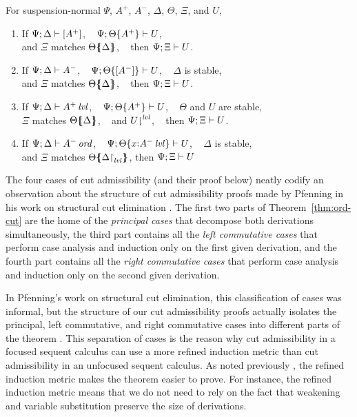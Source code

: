 \bigskip
\begin{theorem}\label{thm:ord-cut}
For suspension-normal $\Psi$, $A^+$, $A^-$, $\Delta$, $\Theta$, $\Xi$, and $U$,
\begin{enumerate}
\item If ${\Psi};{\Delta} \vdash {[ A^+ ]}$, ~
         ${\Psi};{{\Theta}\{{A^+}\}} \vdash {U}$,\\
      and $\Xi$ matches ${\Theta}\mbox{$\{\hspace{-4pt}\{$}{{\Delta}}\mbox{$\}\hspace{-4pt}\}$}$, ~
      then ${\Psi};{\Xi} \vdash {U}$.
\item If ${\Psi};{\Delta} \vdash {A^-}$, ~
         ${\Psi};{{\Theta}\{{[A^-]}\}} \vdash {U}$, ~
         $\Delta$ is stable, \\
      and $\Xi$ matches ${\Theta}\mbox{$\{\hspace{-4pt}\{$}{\Delta}\mbox{$\}\hspace{-4pt}\}$}$, ~
      then ${\Psi};{\Xi} \vdash {U}$.
\item If ${\Psi};{\Delta} \vdash {{A^+}\,{{\it lvl}}}$, ~
         ${\Psi};{{\Theta}\{{A^+}\}} \vdash {U}$, ~
         $\Theta$ and $U$ are stable, \\ 
      $\Xi$ matches ${\Theta}\mbox{$\{\hspace{-4pt}\{$}{\Delta}\mbox{$\}\hspace{-4pt}\}$}$, ~
      and ${U}{\downharpoonright}^{{\it lvl}}$, ~
      then ${\Psi};{\Xi} \vdash {U}$.
\item If ${\Psi};{\Delta} \vdash {{A^-}\,{{\it ord}}}$, ~
         ${\Psi};{{\Theta}\{{x{:}{A^-}\,{{\it lvl}}}\}} \vdash {U}$, ~
         $\Delta$ is stable, \\ 
      and $\Xi$ matches ${\Theta}\mbox{$\{\hspace{-4pt}\{$}{\ensuremath{{\Delta}{\upharpoonright}_{{\it lvl}}}}\mbox{$\}\hspace{-4pt}\}$}$,
      then ${\Psi};{\Xi} \vdash {U}$
\end{enumerate}
\end{theorem}
\bigskip

\noindent
The four cases of cut admissibility (and their proof below) neatly
codify an observation about the structure of cut admissibility proofs
made by Pfenning in his work on structural cut elimination
\cite{pfenning00structural}.  The first two parts of
Theorem~\ref{thm:ord-cut} are the home of the {\it principal cases}
that decompose both derivations simultaneously, the third part
contains all the {\it left commutative cases} that perform case
analysis and induction only on the first given derivation, and the
fourth part contains all the {\it right commutative cases} that
perform case analysis and induction only on the second given
derivation.

In Pfenning's work on structural cut elimination, this classification
of cases was informal, but the structure of our cut admissibility
proofs actually isolates the principal, left commutative, and right
commutative cases into different parts of the theorem
\cite{pfenning00structural}. This separation of cases is the reason
why cut admissibility in a focused sequent calculus can use a more
refined induction metric than cut admissibility in an unfocused
sequent calculus. As noted previously \cite{simmons11structural}, the
refined induction metric makes the theorem easier to prove.  For
instance, the refined induction metric means that we do not need to
rely on the fact that weakening and variable substitution preserve
the size of derivations.

